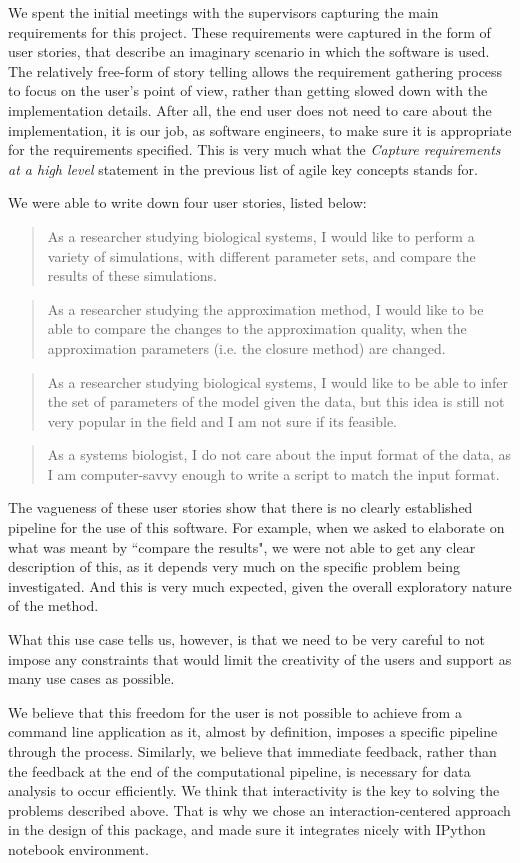 We spent the initial meetings with the supervisors capturing the main requirements for this project. These requirements were captured in the form of user stories, that describe an imaginary scenario in which the software is used. 
The relatively free-form of story telling allows the requirement gathering process to focus on the user's point of view, rather than getting slowed down with the implementation details. 
After all, the end user does not need to care about the implementation, it is our job, as software engineers, to make sure it is appropriate for the requirements specified.
This is very much what the \emph{Capture requirements at a high level} statement in the previous list of agile key concepts stands for.

We were able to write down four user stories, listed below:

\blockquote{As a researcher studying biological systems, I would like to perform a variety of simulations, with different parameter sets, and compare the results of these simulations.}

\blockquote{As a researcher studying the approximation method, I would like to be able to compare the changes to the approximation quality, when the approximation parameters (i.e. the closure method) are changed.}

\blockquote{As a researcher studying biological systems, I would like to be able to infer the set of parameters of the model given the data, but this idea is still not very popular in the field and I am not sure if its feasible.}

\blockquote{As a systems biologist, I do not care about the input format of the data, as I am computer-savvy enough to write a script to match the input format.}

The vagueness of these user stories show that there is no clearly established pipeline for the use of this software. 
For example, when we asked to elaborate on  what was meant by ``compare the results", we were not able to get any clear description of this, as it depends very much on the specific problem being investigated.
And this is very much expected, given the overall exploratory nature of the method. 

What this use case tells us, however, is that we need to be very careful to not impose any constraints that would limit the creativity of the users and support as many use cases as possible.

We believe that this freedom for the user is not possible to achieve from a command line application as it, almost by definition, imposes a specific pipeline through the process. Similarly, we believe that immediate feedback, rather than the feedback at the end of the computational pipeline, is necessary for data analysis to occur efficiently. 
We think that interactivity is the key to solving the problems described above.
That is why we chose an interaction-centered approach in the design of this package, and made sure it integrates nicely with 
 IPython notebook environment.